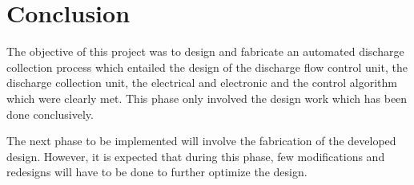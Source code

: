 \section{Conclusion}
\par
The objective of this project was to design and fabricate an automated discharge collection process which entailed the design of the discharge flow control unit, the discharge collection unit, the electrical and electronic and the control algorithm which were clearly met. This phase only involved the design work which has been done conclusively.
\par
The next phase to be implemented will involve the fabrication of the developed design. However, it is expected that during this phase, few modifications and redesigns will have to be done to further optimize the design.
